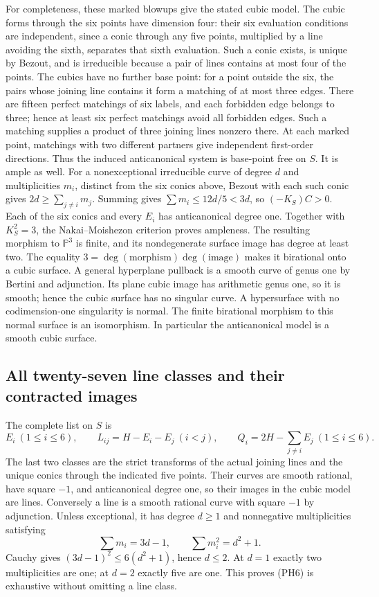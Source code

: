 For completeness, these marked blowups give the stated cubic model.
The cubic forms through the six points have dimension four: their six
evaluation conditions are independent, since a conic through any five
points, multiplied by a line avoiding the sixth, separates that sixth
evaluation. Such a conic exists, is unique by Bezout, and is irreducible
because a pair of lines contains at most four of the points. The cubics
have no further base point: for a point outside the six, the pairs whose
joining line contains it form a matching of at most three edges. There are
fifteen perfect matchings of six labels, and each forbidden edge belongs
to three; hence at least six perfect matchings avoid all forbidden edges.
Such a matching supplies a product of three joining lines
nonzero there. At each marked point, matchings with two different partners
give independent first-order directions. Thus the induced anticanonical
system is base-point free on $S$.
It is ample as well. For a nonexceptional irreducible curve of degree $d$
and multiplicities $m_i$, distinct from the six conics above, Bezout with
each such conic gives $2d\ge\sum_{j\ne i}m_j$. Summing gives
$\sum m_i\le12d/5<3d$, so $(-K_S)C>0$. Each of the six conics and every
$E_i$ has anticanonical degree one. Together with $K_S^2=3$, the
Nakai--Moishezon criterion proves ampleness.
The resulting morphism to $\mathbb P^3$ is finite, and its nondegenerate
surface image has degree at least two. The equality
$3=\deg(\text{morphism})\deg(\text{image})$ makes it birational onto a
cubic surface. A general hyperplane pullback is a smooth curve of genus
one by Bertini and adjunction. Its plane cubic image has arithmetic genus
one, so it is smooth; hence the cubic surface has no singular curve.
A hypersurface with no codimension-one singularity is normal. The finite
birational morphism to this normal surface is an isomorphism. In particular
the anticanonical model is a smooth cubic surface.

\subsection{All twenty-seven line classes and their contracted images}
The complete list on $S$ is
\[
 E_i\ (1\le i\le6),\qquad L_{ij}=H-E_i-E_j\ (i<j),\qquad
 Q_i=2H-\sum_{j\ne i}E_j\ (1\le i\le6).                        \tag{PH6}
\]
The last two classes are the strict transforms of the actual joining lines
and the unique conics through the indicated five points. Their curves are
smooth rational, have square $-1$, and anticanonical degree one, so their
images in the cubic model are lines. Conversely a line is a smooth rational
curve with square $-1$ by adjunction. Unless exceptional, it has degree
$d\ge1$ and nonnegative multiplicities satisfying
\[
 \sum m_i=3d-1,\qquad \sum m_i^2=d^2+1.
\]
Cauchy gives $(3d-1)^2\le6(d^2+1)$, hence $d\le2$. At $d=1$ exactly two
multiplicities are one; at $d=2$ exactly five are one. This proves (PH6)
is exhaustive without omitting a line class.

